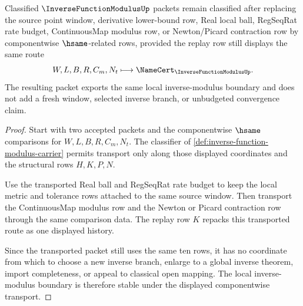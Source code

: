 \begin{theorem}
\label{thm:inverse-function-modulus-newton-window-stability}
Classified $\InverseFunctionModulusUp$ packets remain classified after replacing the source point window, derivative lower-bound row, Real local ball, RegSeqRat rate budget, ContinuousMap modulus row, or Newton/Picard contraction row by componentwise $\hsame$-related rows, provided the replay row still displays the same route
$$
W,L,B,R,C_m,N_t \longmapsto \NameCert_{\InverseFunctionModulusUp}.
$$
The resulting packet exports the same local inverse-modulus boundary and does not add a fresh window, selected inverse branch, or unbudgeted convergence claim.
\end{theorem}
\begin{proof}
Start with two accepted packets and the componentwise $\hsame$ comparisons for $W,L,B,R,C_m,N_t$. The classifier of \autoref{def:inverse-function-modulus-carrier} permits transport only along those displayed coordinates and the structural rows $H,K,P,N$.

Use the transported Real ball and RegSeqRat rate budget to keep the local metric and tolerance rows attached to the same source window. Then transport the ContinuousMap modulus row and the Newton or Picard contraction row through the same comparison data. The replay row $K$ repacks this transported route as one displayed history.

Since the transported packet still uses the same ten rows, it has no coordinate from which to choose a new inverse branch, enlarge to a global inverse theorem, import completeness, or appeal to classical open mapping. The local inverse-modulus boundary is therefore stable under the displayed componentwise transport.
\end{proof}


\begin{closurestatus}{\InverseFunctionModulusUp}
  \theoryclosure{\seedClosure}
  \formalstatus{\unformalizedV}
\end{closurestatus}

